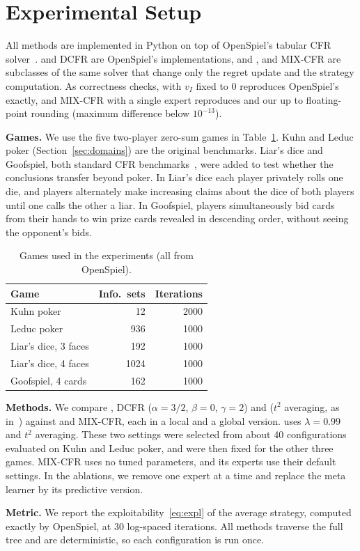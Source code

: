 \section{Experimental Setup}
\label{sec:setup}

All methods are implemented in Python on top of OpenSpiel's tabular CFR
solver~\cite{lanctot2019openspiel}. \cfrp{} and DCFR are OpenSpiel's implementations, and
\pcfrp{}, \ours{} and MIX-CFR are subclasses of the same solver that change only the regret
update and the strategy computation. As correctness checks, \ours{} with $v_I$ fixed to $0$
reproduces OpenSpiel's \cfrp{} exactly, and MIX-CFR with a single expert reproduces \cfrp{}
and our \pcfrp{} up to floating-point rounding (maximum difference below $10^{-13}$).

\textbf{Games.} We use the five two-player zero-sum games in Table~\ref{tab:games}. Kuhn and
Leduc poker (Section~\ref{sec:domains}) are the original benchmarks. Liar's dice and
Goofspiel, both standard CFR benchmarks~\cite{lanctot2009monte}, were added to test whether
the conclusions transfer beyond poker. In Liar's dice each player privately rolls one die, and
players alternately make increasing claims about the dice of both players until one calls the
other a liar. In Goofspiel, players simultaneously bid cards from their hands to win prize
cards revealed in descending order, without seeing the opponent's bids.

\begin{table}[t]
\centering
\caption{Games used in the experiments (all from OpenSpiel).}
\label{tab:games}
\begin{tabular}{@{}lrr@{}}
\toprule
\textbf{Game} & \textbf{Info.\ sets} & \textbf{Iterations} \\
\midrule
Kuhn poker                  & 12    & 2000 \\
Leduc poker                 & 936   & 1000 \\
Liar's dice, 3 faces        & 192   & 1000 \\
Liar's dice, 4 faces        & 1024  & 1000 \\
Goofspiel, 4 cards          & 162   & 1000 \\
\bottomrule
\end{tabular}
\end{table}

\textbf{Methods.} We compare \cfrp{}, DCFR ($\alpha=3/2$, $\beta=0$, $\gamma=2$) and \pcfrp{}
($t^2$ averaging, as in~\cite{farina2021faster}) against \ours{} and MIX-CFR, each in a
local and a global version. \ours{} uses $\lambda = 0.99$ and $t^2$ averaging. These two
settings were selected from about 40 configurations evaluated on Kuhn and Leduc poker, and
were then fixed for the other three games. MIX-CFR uses no tuned parameters, and its experts
use their default settings. In the ablations, we remove one expert at a time and replace the
meta learner by its predictive version.

\textbf{Metric.} We report the exploitability~\eqref{eq:expl} of the average strategy, computed
exactly by OpenSpiel, at 30 log-spaced iterations. All methods traverse the full tree and are
deterministic, so each configuration is run once.
